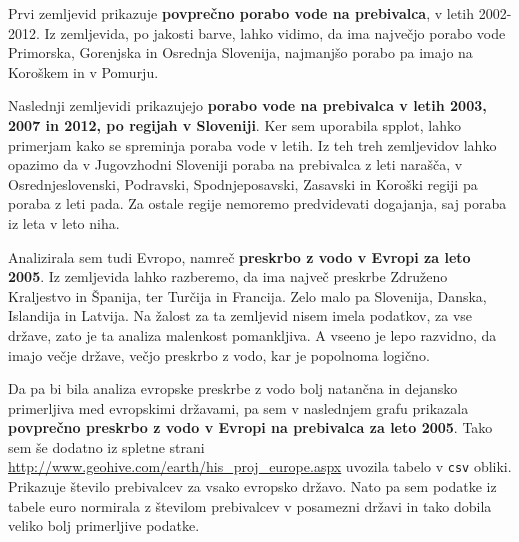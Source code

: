 \documentclass[11pt,a4paper]{article}
\begin{document}
Prvi zemljevid prikazuje \textbf{povprečno porabo vode na prebivalca}, v letih 2002-2012. Iz zemljevida, po jakosti barve, lahko vidimo, da ima največjo porabo vode Primorska, Gorenjska in Osrednja Slovenija, najmanjšo porabo pa imajo na Koroškem in v Pomurju.


\newpage
Naslednji zemljevidi prikazujejo \textbf{porabo vode na prebivalca v letih 2003, 2007 in 2012, po regijah v Sloveniji}. Ker sem uporabila spplot, lahko primerjam kako se spreminja poraba vode v letih. Iz teh treh zemljevidov lahko opazimo da v Jugovzhodni Sloveniji poraba na prebivalca z leti narašča, v Osrednjeslovenski, Podravski, Spodnjeposavski, Zasavski in Koroški regiji pa poraba z leti pada. Za ostale regije nemoremo predvidevati dogajanja, saj poraba iz leta v leto niha. 



\newpage

Analizirala sem tudi Evropo, namreč \textbf{preskrbo z vodo v Evropi za leto 2005}. Iz zemljevida lahko razberemo, da ima največ preskrbe Združeno Kraljestvo in Španija, ter Turčija in Francija. Zelo malo pa Slovenija, Danska, Islandija in Latvija. Na žalost za ta zemljevid nisem imela podatkov, za vse države, zato je ta analiza malenkost pomankljiva. A vseeno je lepo razvidno, da imajo večje države, večjo preskrbo z vodo, kar je popolnoma logično.



\newpage

Da pa bi bila analiza evropske preskrbe z vodo bolj natančna in dejansko primerljiva med evropskimi državami, pa sem v naslednjem grafu prikazala \textbf{povprečno preskrbo z vodo v Evropi na prebivalca za leto 2005}. Tako sem še dodatno iz spletne strani \url{http://www.geohive.com/earth/his_proj_europe.aspx} uvozila tabelo v \verb|csv| obliki. Prikazuje število prebivalcev za vsako evropsko državo. Nato pa sem podatke iz tabele euro normirala z številom prebivalcev v posamezni državi in tako dobila veliko bolj primerljive podatke.\\
\end{document}
